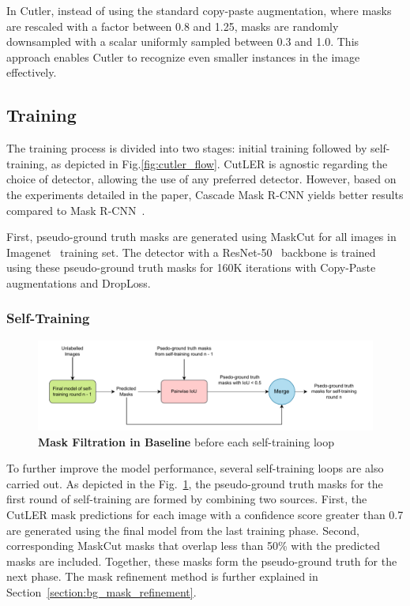 In Cutler, instead of using the standard copy-paste augmentation, where masks are rescaled with a factor between 0.8 and 1.25, masks are randomly downsampled with a scalar uniformly sampled between 0.3 and 1.0. This approach enables Cutler to recognize even smaller instances in the image effectively.

\subsection{Training}
The training process is divided into two stages: initial training followed by self-training, as depicted in Fig.\ref{fig:cutler_flow}. CutLER is agnostic regarding the choice of detector, allowing the use of any preferred detector. However, based on the experiments detailed in the paper, Cascade Mask R-CNN\cite{cai2019cascadercnnhighquality} yields better results compared to Mask R-CNN~\cite{he2018maskrcnn}.

First, pseudo-ground truth masks are generated using MaskCut for all images in Imagenet~\cite{deng2009imagenet} training set. The detector with a ResNet-50~\cite{he2015deepresiduallearningimage} backbone is trained using these pseudo-ground truth masks for 160K iterations with Copy-Paste augmentations and DropLoss.

\subsubsection{Self-Training}
\begin{figure}
	\centering
	\includegraphics[width=1\textwidth]{Images/main/baseline_mask_filtration.pdf}
	\caption[\textbf{Mask Filtration Method in Baseline}]
	{\textbf{Mask Filtration in Baseline} before each self-training loop}
	\label{fig:baseline_mask_filtration_1}
\end{figure}


To further improve the model performance, several self-training loops are also carried out. As depicted in the Fig.~\ref{fig:baseline_mask_filtration_1}, the pseudo-ground truth masks for the first round of self-training are formed by combining two sources. First, the CutLER mask predictions for each image with a confidence score greater than 0.7 are generated using the final model from the last training phase. Second, corresponding MaskCut masks that overlap less than 50\% with the predicted masks are included. Together, these masks form the pseudo-ground truth for the next phase. The mask refinement method is further explained in Section~\ref{section:bg_mask_refinement}.

